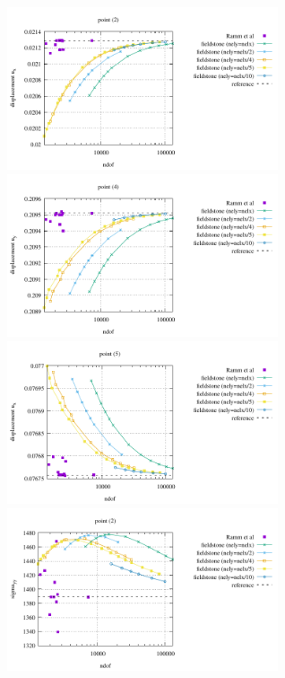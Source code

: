 \begin{center}
\includegraphics[width=8cm]{python_codes/fieldstone_124/results/exp3/ux2}
\includegraphics[width=8cm]{python_codes/fieldstone_124/results/exp3/uy4}\\
\includegraphics[width=8cm]{python_codes/fieldstone_124/results/exp3/ux5}
\includegraphics[width=8cm]{python_codes/fieldstone_124/results/exp3/sigmayy2}
\end{center}


